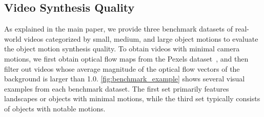 


\subsection{Video Synthesis Quality}
As explained in the main paper, we provide three benchmark datasets of real-world videos categorized by small, medium, and large object motions to evaluate the object motion synthesis quality.
To obtain videos with minimal camera motions, we first obtain optical flow maps from the Pexels dataset~\cite{pexels_dataset}, and then filter out videos whose average magnitude of the optical flow vectors of the background is larger than 1.0.
\cref{fig:benchmark_example} shows several visual examples from each benchmark dataset.
The first set primarily features landscapes or objects with minimal motions, while the third set typically consists of objects with notable motions.






